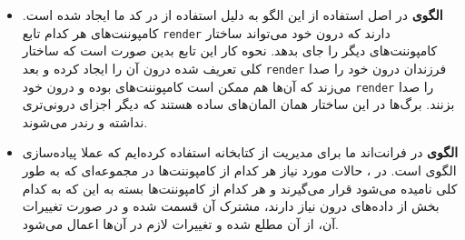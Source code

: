 \begin{itemize}
	\item 
	\textbf{الگوی }
	در اصل استفاده از این الگو به دلیل استفاده از  در کد ما ایجاد شده است. کامپوننت‌های  هر کدام تابع \verb+render+ دارند که درون خود می‌تواند ساختار کامپوننت‌های دیگر را جای بدهد. نحوه کار این تابع بدین صورت است که ساختار کلی تعریف شده درون آن را ایجاد کرده و بعد \verb+render+ فرزندان درون خود را صدا می‌زند که آن‌ها هم ممکن است کامپوننت‌های  بوده و درون خود \verb+render+ را صدا بزنند. برگ‌ها در این ساختار همان المان‌های ساده  هستند که دیگر اجزای درونی‌تری نداشته و رندر می‌شوند.
	
	\item 
	\textbf{الگوی }
	در فرانت‌اند ما برای مدیریت  از کتابخانه  استفاده کرده‌ایم که عملا پیاده‌سازی‌ الگوی  است. در ، حالات مورد نیاز هر کدام از کامپوننت‌ها در مجموعه‌ای که به طور کلی  نامیده می‌شود قرار می‌گیرند و هر کدام از کامپوننت‌ها بسته به این که به کدام بخش از داده‌های درون  نیاز دارند، مشترک آن قسمت شده و در صورت تغییرات آن، از آن مطلع شده و تغییرات لازم در آن‌ها اعمال می‌شود.
	
	 
\end{itemize}